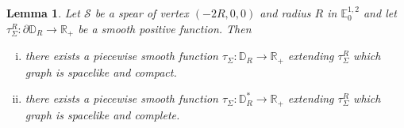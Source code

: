 \documentclass[a4paper,12pt]{article}
\def\R{\mathbb{R}}
\newcommand{\mass}[1]{{\mathbb E}^{1,2}_{#1}}
\newtheorem{lemou}{Lemma}[section]          %
\begin{document}
     
   \begin{lemou}\label{btzlem:curve_extension}\label{lem:curve_extension} Let $\mathcal S$ be a spear of vertex $(-2R,0,0)$ and radius $R$  in $\mass{0}$ and 
    let $\tau_{\Sigma}^R: \partial \mathbb D_R \rightarrow \R_+$ be a smooth positive function. Then 
    \begin{enumerate}[(i)]
     \item there exists a piecewise smooth function $\tau_\Sigma: \mathbb D_R\rightarrow \R_+$ extending $\tau_\Sigma^R$ which graph is spacelike and compact.
     \item there exists a piecewise smooth function $\tau_\Sigma:\mathbb D_R^*\rightarrow \R_+$ extending $\tau_\Sigma^R$ which graph is spacelike and complete.
    \end{enumerate}
    \end{lemou}
   
  
    
\end{document}
